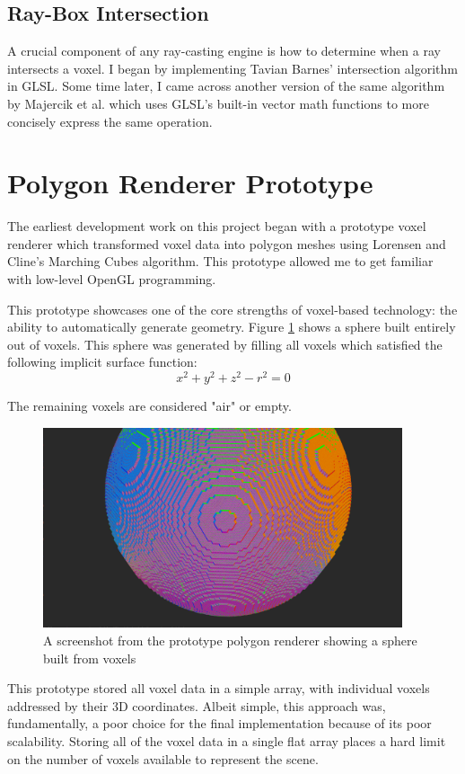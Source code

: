 \subsection{Ray-Box Intersection}
A crucial component of any ray-casting engine is how to determine when a ray intersects a voxel. I began by implementing Tavian Barnes' intersection algorithm \autocite{barnes2011} in GLSL. Some time later, I came across another version of the same algorithm by Majercik et al. \autocite{majercik2018ray} which uses GLSL's built-in vector math functions to more concisely express the same operation.

\section{Polygon Renderer Prototype}\label{sec:poly_renderer_research}
The earliest development work on this project began with a prototype voxel renderer which transformed voxel data into polygon meshes using Lorensen and Cline's Marching Cubes algorithm. This prototype allowed me to get familiar with low-level OpenGL programming.

This prototype showcases one of the core strengths of voxel-based technology: the ability to automatically generate geometry. Figure \ref{fig:polygon_renderer_sphere} shows a sphere built entirely out of voxels. This sphere was generated by filling all voxels which satisfied the following implicit surface function:
$$
x^2 + y^2 + z^2 - r^2 = 0
$$

The remaining voxels are considered "air" or empty.


\begin{figure}[ht]
    \centering
    \includegraphics[width=400px]{graphics/prototype_sphere.png}
    \caption{A screenshot from the prototype polygon renderer showing a sphere built from voxels}
    \label{fig:polygon_renderer_sphere}
\end{figure}

This prototype stored all voxel data in a simple array, with individual voxels addressed by their 3D coordinates. Albeit simple, this approach was, fundamentally, a poor choice for the final implementation because of its poor scalability. Storing all of the voxel data in a single flat array places a hard limit on the number of voxels available to represent the scene.
